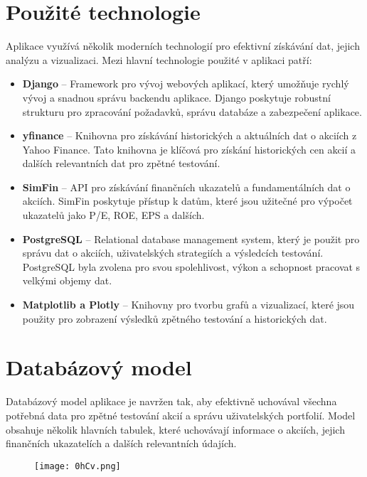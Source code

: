 \documentclass[12pt, a4paper]{report}
\begin{document}
\section{Použité technologie}


Aplikace využívá několik moderních technologií pro efektivní získávání dat, jejich analýzu a vizualizaci. Mezi hlavní technologie použité v aplikaci patří:

\begin{itemize}
    \item \textbf{Django} – Framework pro vývoj webových aplikací, který umožňuje rychlý vývoj a snadnou správu backendu aplikace. Django poskytuje robustní strukturu pro zpracování požadavků, správu databáze a zabezpečení aplikace.
    \item \textbf{yfinance} – Knihovna pro získávání historických a aktuálních dat o akciích z Yahoo Finance. Tato knihovna je klíčová pro získání historických cen akcií a dalších relevantních dat pro zpětné testování.
    \item \textbf{SimFin} – API pro získávání finančních ukazatelů a fundamentálních dat o akciích. SimFin poskytuje přístup k datům, které jsou užitečné pro výpočet ukazatelů jako P/E, ROE, EPS a dalších.
    \item \textbf{PostgreSQL} – Relational database management system, který je použit pro správu dat o akciích, uživatelských strategiích a výsledcích testování. PostgreSQL byla zvolena pro svou spolehlivost, výkon a schopnost pracovat s velkými objemy dat.
    \item \textbf{Matplotlib a Plotly} – Knihovny pro tvorbu grafů a vizualizací, které jsou použity pro zobrazení výsledků zpětného testování a historických dat.
\end{itemize}

\section{Databázový model}


Databázový model aplikace je navržen tak, aby efektivně uchovával všechna potřebná data pro zpětné testování akcií a správu uživatelských portfolií. Model obsahuje několik hlavních tabulek, které uchovávají informace o akciích, jejich finančních ukazatelích a dalších relevantních údajích.

\begin{figure}[h]
			\centering
			\texttt{[image: 0hCv.png]}
		\end{figure}
\end{document}
